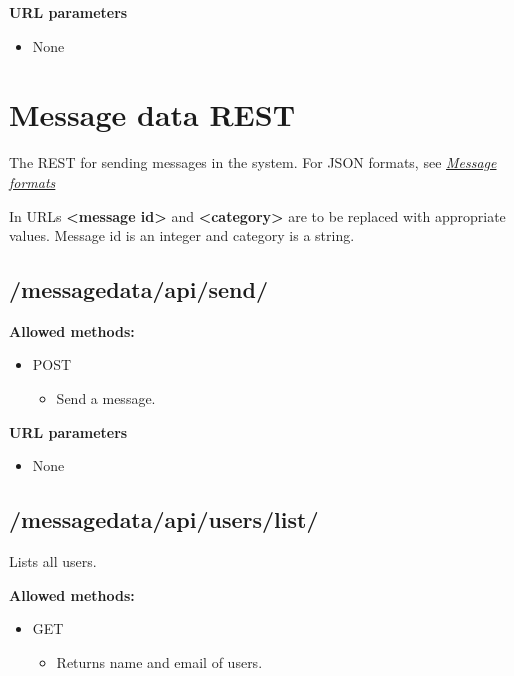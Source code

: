 \documentclass[letterpaper,10pt,english]{sphinxmanual}
\begin{document}
\textbf{URL parameters}
\begin{itemize}
\item {} 
None

\end{itemize}


\section{Message data REST}
\label{restdoc:messagerest}\label{restdoc:message-data-rest}
The REST for sending messages in the system. For JSON formats, see {\hyperref[json/messagejson:messagejson]{\emph{Message formats}}}

In URLs \textbf{\textless{}message id\textgreater{}} and \textbf{\textless{}category\textgreater{}} are to be replaced with appropriate values. Message id is an integer and
category is a string.


\subsection{/messagedata/api/send/}
\label{restdoc:messagedata-api-send}
\textbf{Allowed methods:}
\begin{itemize}
\item {} 
POST
\begin{itemize}
\item {} 
Send a message.

\end{itemize}

\end{itemize}

\textbf{URL parameters}
\begin{itemize}
\item {} 
None

\end{itemize}


\subsection{/messagedata/api/users/list/}
\label{restdoc:messagedata-api-users-list}
Lists all users.

\textbf{Allowed methods:}
\begin{itemize}
\item {} 
GET
\begin{itemize}
\item {} 
Returns name and email of users.

\end{itemize}

\end{itemize}
\end{document}
